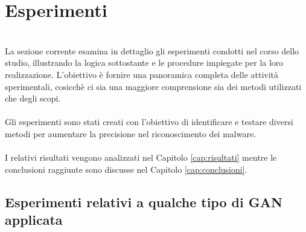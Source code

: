 \section{Esperimenti}
~\\
\indent La sezione corrente esamina in dettaglio gli esperimenti condotti nel corso dello studio, illustrando la logica sottostante e le procedure impiegate per la loro realizzazione. 
L'obiettivo è fornire una panoramica completa delle attività sperimentali, cosicchè ci sia una maggiore comprensione sia dei metodi utilizzati che degli scopi.
\\\\
Gli esperimenti sono stati creati con l'obiettivo di identificare e testare diversi metodi per aumentare la precisione nel riconoscimento dei malware.
\\\\
I relativi risultati vengono analizzati nel Capitolo \ref{cap:risultati} mentre le conclusioni raggiunte sono discusse nel Capitolo \ref{cap:conclusioni}.

\subsection{Esperimenti relativi a qualche tipo di GAN applicata}
~\\ 






